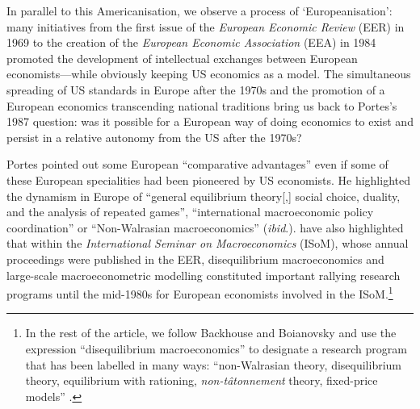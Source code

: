 \documentclass[]{elsarticle} %
\begin{document}
In parallel to this Americanisation, we observe a process of
`Europeanisation': many initiatives from the first issue of the
\emph{European Economic Review} (EER) in 1969 to the creation of the
\emph{European Economic Association} (EEA) in 1984 promoted the
development of intellectual exchanges between European
economists---while obviously keeping US economics as a model. The
simultaneous spreading of US standards in Europe after the 1970s and the
promotion of a European economics transcending national traditions bring
us back to Portes's 1987 question: was it possible for a European way of
doing economics to exist and persist in a relative autonomy from the US
after the 1970s?

Portes pointed out some European ``comparative advantages''
\citep[1332]{portes1987} even if some of these European specialities had
been pioneered by US economists. He highlighted the dynamism in Europe
of ``general equilibrium theory{[},{]} social choice, duality, and the
analysis of repeated games'', ``international macroeconomic policy
coordination'' or ``Non-Walrasian macroeconomics'' (\emph{ibid}.).
\citet{goutsmedt2021} have also highlighted that within the
\emph{International Seminar on Macroeconomics} (ISoM), whose annual
proceedings were published in the EER, disequilibrium macroeconomics and
large-scale macroeconometric modelling constituted important rallying
research programs until the mid-1980s for European economists involved
in the ISoM.\footnote{In the rest of the article, we follow Backhouse
  and Boianovsky and use the expression ``disequilibrium
  macroeconomics'' to designate a research program that has been
  labelled in many ways: ``non-Walrasian theory, disequilibrium theory,
  equilibrium with rationing, \emph{non-tâtonnement} theory, fixed-price
  models'' \citep[8-9]{backhouseboianovski2013}.}
\end{document}
